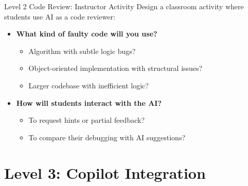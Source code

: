 \documentclass[xcolor=dvipsnames, aspectratio=169]{beamer}
\begin{document}
\begin{frame}{Level 2 Code Review: Instructor Activity}
  Design a classroom activity where students use AI as a code reviewer:
  
  \begin{itemize}
    \item \textbf{What kind of faulty code will you use?}
      \begin{itemize}
        \item Algorithm with subtle logic bugs?
        \item Object-oriented implementation with structural issues?
        \item Larger codebase with inefficient logic?
      \end{itemize}
    \item \textbf{How will students interact with the AI?}
      \begin{itemize}
        \item To request hints or partial feedback?
        \item To compare their debugging with AI suggestions?
      \end{itemize}
  \end{itemize}
\end{frame}

\section{Level 3: Copilot Integration}
\end{document}
